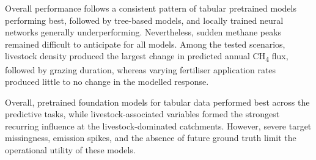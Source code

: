 
Overall performance follows a consistent pattern of tabular pretrained models performing best,
followed by tree-based models, and locally trained neural networks generally underperforming.
Nevertheless, sudden methane peaks remained difficult to anticipate for all models. 
Among the tested scenarios, livestock density produced the largest change in predicted annual 
CH\textsubscript{4} flux, followed by grazing duration, whereas varying fertiliser 
application rates produced little to no change in the modelled response.

Overall, pretrained foundation models for tabular data performed best across the predictive tasks,
while livestock-associated variables formed the strongest recurring influence
at the livestock-dominated catchments. However, severe target missingness,
emission spikes, and the absence of future ground truth limit 
the operational utility of these models.
